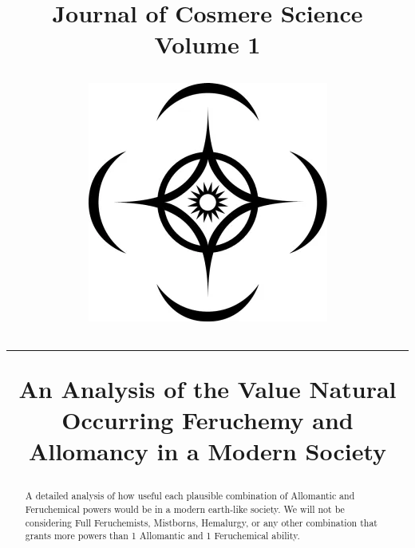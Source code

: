 \documentclass[conference]{IEEEtran}
\newcommand{\n}{\hfill\break}
\begin{document}
\makeatletter
\renewcommand{\@IEEEsectpunct}{\n\ \,}%

\newlength{\logoheight}
\setlength{\logoheight}{50pt} %

    

\title{\parbox[c]{.75\linewidth}{{\selectfont\Huge{\textbf{Journal of Cosmere Science}}\\\huge{Volume 1}}}%
    \hfill%
    \raisebox{\dimexpr-.5\logoheight+.5ex\relax}%
    {\includegraphics[height=\logoheight]{images/cosmere_symbol.png}}\par%
    \vspace{15pt}%
    
    \hrule
    \n
    \textbf{An Analysis of the Value Natural Occurring Feruchemy and Allomancy in a Modern Society}}

\author{
}

\maketitle

\begin{abstract}
A detailed analysis of how useful each plausible combination of Allomantic and Feruchemical powers would be in a modern earth-like society.  We will not be considering Full Feruchemists, Mistborns, Hemalurgy, or any other combination that grants more powers than 1 Allomantic and 1 Feruchemical ability.
\end{abstract}
\end{document}
